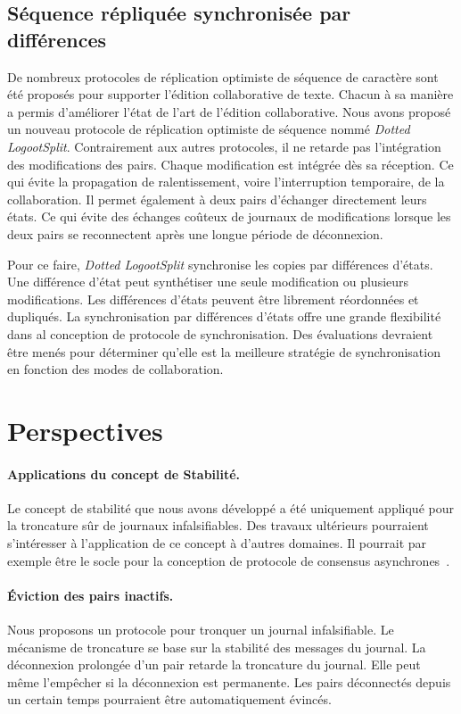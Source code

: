 \subsection{Séquence répliquée synchronisée par différences}

De nombreux protocoles de réplication optimiste de séquence de caractère sont été proposés pour supporter l'édition collaborative de texte.
Chacun à sa manière a permis d'améliorer l'état de l'art de l'édition collaborative.
Nous avons proposé un nouveau protocole de réplication optimiste de séquence nommé \emph{Dotted LogootSplit}.
Contrairement aux autres protocoles, il ne retarde pas l'intégration des modifications des pairs.
Chaque modification est intégrée dès sa réception.
Ce qui évite la propagation de ralentissement, voire l'interruption temporaire, de la collaboration.
Il permet également à deux pairs d'échanger directement leurs états.
Ce qui évite des échanges coûteux de journaux de modifications lorsque les deux pairs se reconnectent après une longue période de déconnexion.

Pour ce faire, \emph{Dotted LogootSplit} synchronise les copies par différences d'états.
Une différence d'état peut synthétiser une seule modification ou plusieurs modifications.
Les différences d'états peuvent être librement réordonnées et dupliqués.
La synchronisation par différences d'états offre une grande flexibilité dans al conception de protocole de synchronisation.
Des évaluations devraient être menés pour déterminer qu'elle est la meilleure stratégie de synchronisation en fonction des modes de collaboration.


\section{Perspectives}

\paragraph{Applications du concept de Stabilité.} Le concept de stabilité que nous avons développé a été uniquement appliqué pour la troncature sûr de journaux infalsifiables.
Des travaux ultérieurs pourraient s'intéresser à l'application de ce concept à d'autres domaines.
Il pourrait par exemple être le socle pour la conception de protocole de consensus asynchrones~\autocite{bracha1985asynchronous}.

\paragraph{Éviction des pairs inactifs.}
Nous proposons un protocole pour tronquer un journal infalsifiable.
Le mécanisme de troncature se base sur la stabilité des messages du journal.
La déconnexion prolongée d'un pair retarde la troncature du journal.
Elle peut même l'empêcher si la déconnexion est permanente.
Les pairs déconnectés depuis un certain temps pourraient être automatiquement évincés.

